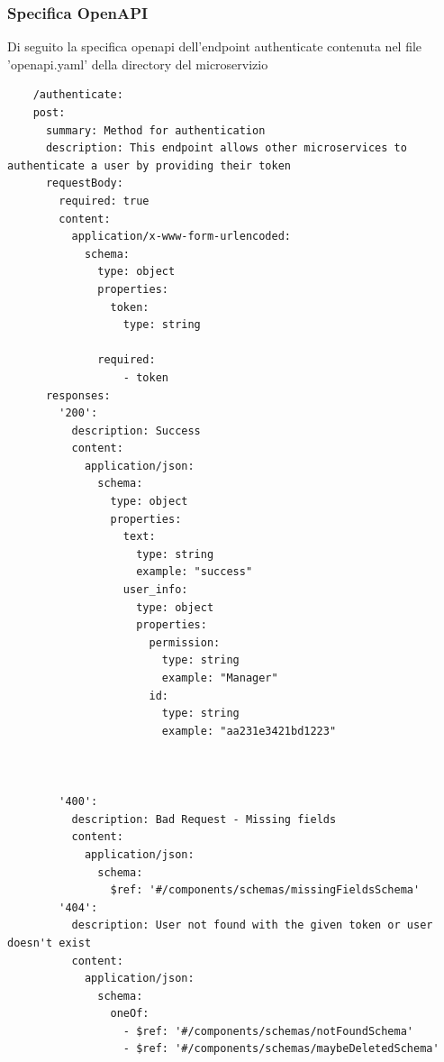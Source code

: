 \documentclass{report}
\begin{document}
\subsubsection*{Specifica OpenAPI}
Di seguito la specifica openapi dell'endpoint authenticate contenuta nel file 'openapi.yaml' della directory del microservizio
\begin{verbatim}
	/authenticate:
    post:
      summary: Method for authentication 
      description: This endpoint allows other microservices to authenticate a user by providing their token
      requestBody:
        required: true
        content:
          application/x-www-form-urlencoded:
            schema:
              type: object
              properties:
                token:
                  type: string
                  
              required:
                  - token
      responses:
        '200':
          description: Success
          content:
            application/json:
              schema:
                type: object
                properties:
                  text:
                    type: string
                    example: "success"
                  user_info:
                    type: object
                    properties:
                      permission:
                        type: string
                        example: "Manager"
                      id:
                        type: string
                        example: "aa231e3421bd1223"

      

        '400':
          description: Bad Request - Missing fields 
          content:
            application/json:
              schema:
                $ref: '#/components/schemas/missingFieldsSchema'
        '404':
          description: User not found with the given token or user doesn't exist 
          content:
            application/json:
              schema:
                oneOf:
                  - $ref: '#/components/schemas/notFoundSchema'
                  - $ref: '#/components/schemas/maybeDeletedSchema'

\end{verbatim}
\end{document}
